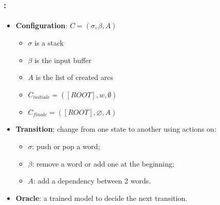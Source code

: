 \documentclass[xcolor=table]{beamer}
\begin{document}
\begin{frame}
	\frametitle{\insertshortsubtitle: \insertsection}
	\framesubtitle{\insertsubsection}

	\begin{minipage}{.6\textwidth}
		\begin{itemize}
			\item \textbf{Configuration}:  $C = (\sigma, \beta, A)$
			\begin{itemize}
				\item $\sigma$ is a stack
				\item $\beta$ is the input buffer
				\item $A$ is the list of created arcs
				\item $C_{initiale} = ([ROOT], w, \emptyset)$
				\item $C_{finale} = ([ROOT], \varnothing, A)$
			\end{itemize}
		\end{itemize}
	\end{minipage}
	\begin{minipage}{.38\textwidth}
	\end{minipage}
	
	\begin{itemize}
		\item \textbf{Transition}; change from one state to another using actions on:
		\begin{itemize}
			\item $\sigma$: push or pop a word;
			\item $\beta$: remove a word or add one at the beginning;
			\item $A$: add a dependency between 2 words.
		\end{itemize}
		\item \textbf{Oracle}: a trained model to decide the next transition.
	\end{itemize}

\end{frame}
\end{document}
